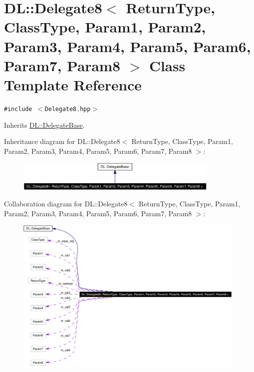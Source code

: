 \hypertarget{classDL_1_1Delegate8}{
\section{DL::Delegate8$<$ Return\-Type, Class\-Type, Param1, Param2, Param3, Param4, Param5, Param6, Param7, Param8 $>$ Class Template Reference}
\label{classDL_1_1Delegate8}
}
{\tt \#include $<$Delegate8.hpp$>$}

Inherits \hyperlink{classDL_1_1DelegateBase}{DL::Delegate\-Base}.

Inheritance diagram for DL::Delegate8$<$ Return\-Type, Class\-Type, Param1, Param2, Param3, Param4, Param5, Param6, Param7, Param8 $>$:\begin{figure}[H]
\begin{center}
\leavevmode
\includegraphics[width=279pt]{classDL_1_1Delegate8__inherit__graph}
\end{center}
\end{figure}
Collaboration diagram for DL::Delegate8$<$ Return\-Type, Class\-Type, Param1, Param2, Param3, Param4, Param5, Param6, Param7, Param8 $>$:\begin{figure}[H]
\begin{center}
\leavevmode
\includegraphics[width=375pt]{classDL_1_1Delegate8__coll__graph}
\end{center}
\end{figure}
